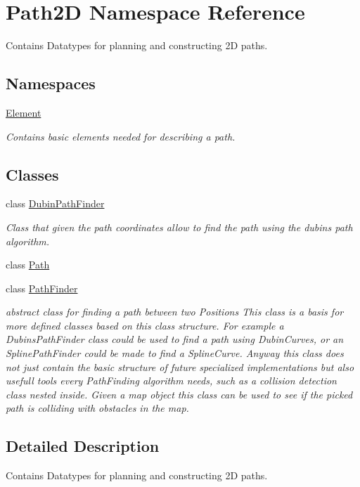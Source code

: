 \hypertarget{namespace_path2_d}{}\section{Path2D Namespace Reference}
\label{namespace_path2_d}


Contains Datatypes for planning and constructing 2D paths.  


\subsection*{Namespaces}
\begin{DoxyCompactItemize}
\item 
 \mbox{\hyperlink{namespace_path2_d_1_1_element}{Element}}
\begin{DoxyCompactList}\small\item\em Contains basic elements needed for describing a path. \end{DoxyCompactList}\end{DoxyCompactItemize}
\subsection*{Classes}
\begin{DoxyCompactItemize}
\item 
class \mbox{\hyperlink{class_path2_d_1_1_dubin_path_finder}{Dubin\+Path\+Finder}}
\begin{DoxyCompactList}\small\item\em Class that given the path coordinates allow to find the path using the dubins path algorithm. \end{DoxyCompactList}\item 
class \mbox{\hyperlink{class_path2_d_1_1_path}{Path}}
\item 
class \mbox{\hyperlink{class_path2_d_1_1_path_finder}{Path\+Finder}}
\begin{DoxyCompactList}\small\item\em abstract class for finding a path between two Positions  This class is a basis for more defined classes based on this class structure. For example a Dubins\+Path\+Finder class could be used to find a path using Dubin\+Curves, or an Spline\+Path\+Finder could be made to find a Spline\+Curve. Anyway this class does not just contain the basic structure of future specialized implementations but also usefull tools every Path\+Finding algorithm needs, such as a collision detection class nested inside. Given a map object this class can be used to see if the picked path is colliding with obstacles in the map. \end{DoxyCompactList}\end{DoxyCompactItemize}


\subsection{Detailed Description}
Contains Datatypes for planning and constructing 2D paths. 